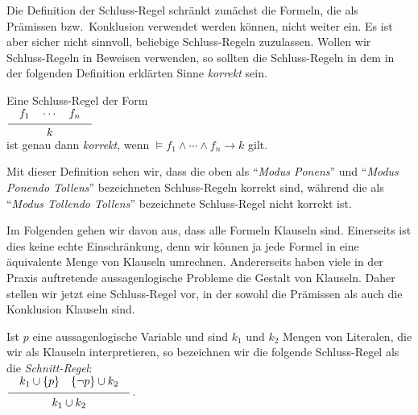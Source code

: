 \noindent
Die Definition der Schluss-Regel schr\"{a}nkt zun\"{a}chst die Formeln, die als Pr\"{a}missen
bzw.~Konklusion verwendet werden k\"{o}nnen, nicht weiter ein.  Es ist aber sicher nicht
sinnvoll, beliebige Schluss-Regeln zuzulassen.  Wollen wir Schluss-Regeln in Beweisen
verwenden, so sollten die Schluss-Regeln in dem in der folgenden Definition erkl\"{a}rten
Sinne \emph{\color{blue}korrekt} sein.

\begin{Definition}
  Eine Schluss-Regel der Form \\[0.2cm]
  \hspace*{1.3cm} $\schluss{f_1 \quad \cdots \quad f_n}{k}$ \\[0.2cm]
  ist genau dann \emph{\color{blue}korrekt}, wenn 
  $\models f_1 \wedge \cdots \wedge f_n \rightarrow k$ gilt. \eox
\end{Definition}
Mit dieser Definition sehen wir, dass 
die oben als ``\emph{\color{blue}Modus Ponens}'' und ``\emph{\color{blue}Modus Ponendo Tollens}'' bezeichneten
Schluss-Regeln korrekt sind, w\"{a}hrend die als  ``\emph{\color{blue}Modus Tollendo Tollens}'' bezeichnete
Schluss-Regel nicht korrekt ist.

Im Folgenden gehen wir davon aus, dass alle Formeln Klauseln sind.  Einerseits ist dies
keine echte Einschr\"{a}nkung, denn wir k\"{o}nnen ja jede Formel in eine \"{a}quivalente Menge von
Klauseln umrechnen.  Andererseits haben viele in der Praxis auftretende aussagenlogische
Probleme die Gestalt von Klauseln.  Daher stellen wir jetzt eine Schluss-Regel vor, in der
sowohl die Pr\"{a}missen als auch die Konklusion Klauseln sind.
     
\begin{Definition}
    Ist $p$ eine aussagenlogische Variable und sind $k_1$ und $k_2$ Mengen von Literalen,
    die wir als Klauseln interpretieren, so bezeichnen wir die folgende Schluss-Regel
    als die \emph{\color{blue}Schnitt-Regel}: 
    \\[0.2cm]
    \hspace*{1.3cm}
    $\displaystyle \schluss{ k_1 \cup \{p\} \quad \{\neg p\} \cup k_2 }{k_1 \cup k_2}$. 
    \eox
\end{Definition}

